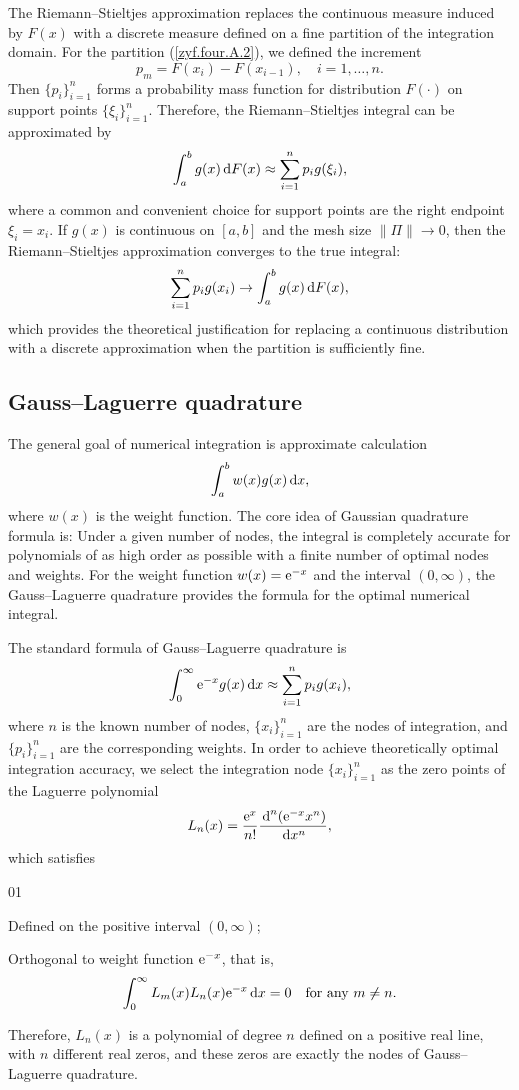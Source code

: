 The Riemann--Stieltjes approximation replaces the continuous measure induced by $F(x)$ with a discrete measure defined on a fine partition of the integration domain. For the partition (\ref{zyf.four.A.2}), we defined the increment
$$
    p_m = F(x_i) - F(x_{i-1}), \quad i = 1, \dots, n.
$$
Then $\{p_i\}_{i=1}^n$ forms a probability mass function for distribution $F(\cdot)$ on support points $\{\xi_i\}_{i=1}^n$. Therefore, the Riemann--Stieltjes integral can be approximated by
\begin{eqnarray}    \label{zyf.four.A.3}
     \int_a^b g(x) \,\mbox{d} F(x) \approx \sum_{i=1}^n p_i g(\xi_i),
\end{eqnarray}
where a common and convenient choice for support points are the right endpoint $\xi_i = x_i$. If $g(x)$ is continuous on $[a, b]$ and the mesh size $\|\Pi\| \to 0$, then the Riemann--Stieltjes approximation converges to the true integral:
$$
    \sum_{i=1}^n p_i g(x_i) \to \int_a^b g(x) \,\mbox{d} F(x),
$$
which provides the theoretical justification for replacing a continuous distribution with a discrete approximation when the partition is sufficiently fine.

\subsection{Gauss--Laguerre quadrature}\label{zyf.four.sec:GLquadrature}      %

The general goal of numerical integration is approximate calculation
$$
    \int_a^b w(x) g(x) \,\mbox{d} x,
$$
where $w(x)$ is the weight function. The core idea of Gaussian quadrature formula is: Under a given number of nodes, the integral is completely accurate for polynomials of as high order as possible with a finite number of optimal nodes and weights. For the weight function $w(x) = {\rm e}^{-x}$ and the interval $(0, \infty)$, the Gauss--Laguerre quadrature provides the formula for the optimal numerical integral.

The standard formula of Gauss--Laguerre quadrature is
$$
    \int_0^\infty {\rm e}^{-x} g(x) \,\mbox{d} x \approx \sum_{i=1}^n p_i g(x_i),
$$
where $n$ is the known number of nodes, $\{x_i\}_{i=1}^n$ are the nodes of integration, and $\{p_i\}_{i=1}^n$ are the corresponding weights. In order to achieve theoretically optimal integration accuracy, we select the integration node $\{x_i\}_{i=1}^n$ as the zero points of the Laguerre polynomial
$$
    L_n(x) = \frac{{\rm e}^x}{n!} \frac{\,\mbox{d}^n ({\rm e}^{-x} x^n)}{\,\mbox{d} x^n},
$$
which satisfies
\begin{namelist} {01}
    \item[\hspace{0.08cm} (1)] Defined on the positive interval $(0, \infty)$;
    \item[\hspace{0.08cm} (2)] Orthogonal to weight function ${\rm e}^{-x}$, that is,
    $$
        \int_0^\infty L_m(x) L_n(x) {\rm e}^{-x} \,\mbox{d} x = 0 \quad \mbox{for any } m \ne n.
    $$
\end{namelist}
Therefore, $L_n(x)$ is a polynomial of degree $n$ defined on a positive real line, with $n$ different real zeros, and these zeros are exactly the nodes of Gauss--Laguerre quadrature.

